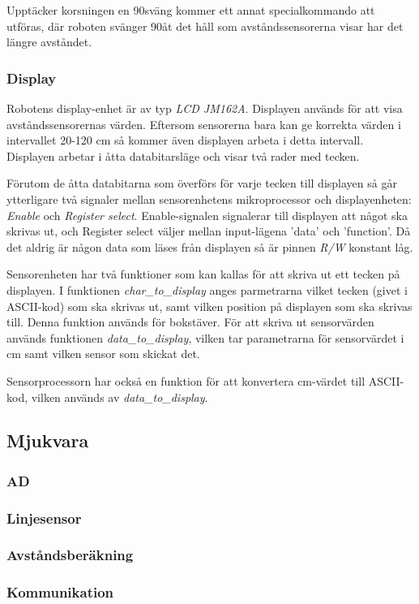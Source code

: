 Upptäcker korsningen en 90\degree sväng kommer ett annat specialkommando att 
utföras, där roboten svänger 90\degree åt det håll som avståndssensorerna 
visar har det längre avståndet.


\subsubsection{Display}
Robotens display-enhet är av typ \emph{LCD JM162A}. Displayen används för att visa avståndssensorernas värden. Eftersom sensorerna bara kan ge korrekta värden i intervallet 20-120 cm så kommer även displayen arbeta i detta intervall. Displayen arbetar i åtta databitarsläge och visar två rader med tecken. 

Förutom de åtta databitarna som överförs för varje tecken till displayen så går ytterligare två signaler mellan sensorenhetens mikroprocessor och displayenheten: \emph{Enable} och \emph{Register select}. Enable-signalen signalerar till displayen att något ska skrivas ut, och Register select väljer mellan input-lägena 'data' och 'function'. Då det aldrig är någon data som läses från displayen så är pinnen \emph{R/W} konstant låg. 

Sensorenheten har två funktioner som kan kallas för att skriva ut ett tecken på displayen. I funktionen \emph{char\_to\_display} anges parmetrarna vilket tecken (givet i ASCII-kod) som ska skrivas ut, samt vilken position på displayen som ska skrivas till. Denna funktion används för bokstäver. För att skriva ut sensorvärden används funktionen \emph{data\_to\_display}, vilken tar parametrarna för sensorvärdet i cm samt vilken sensor som skickat det. 

Sensorprocessorn har också en funktion för att konvertera cm-värdet till ASCII-kod, vilken används av \emph{data\_to\_display}.

\subsection{Mjukvara}

\subsubsection{AD}

\subsubsection{Linjesensor}


\subsubsection{Avståndsberäkning}


\subsubsection{Kommunikation}

